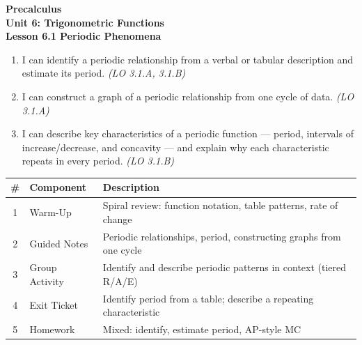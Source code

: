 \documentclass[10pt]{article}
\begin{document}
\vspace{-0.8in}

\begin{center}
  {\color{white}\textbf{\LARGE Precalculus}}\\[4pt]
  {\color{skymid}\large\textbf{Unit 6: Trigonometric Functions}}\\[6pt]
  {\color{white}\textbf{\large Lesson 6.1 \quad Periodic Phenomena}}
\end{center}

\vspace{0.22in}
\namedateperiod
\vspace{0.18in}

\begin{learningtargetbox}
\small
\begin{enumerate}[leftmargin=1.5em, itemsep=5pt]
  \item I can identify a periodic relationship from a verbal or tabular description
    and estimate its period. \hfill\textit{(LO 3.1.A, 3.1.B)}
  \item I can construct a graph of a periodic relationship from one cycle of data.
    \hfill\textit{(LO 3.1.A)}
  \item I can describe key characteristics of a periodic function --- period,
    intervals of increase/decrease, and concavity --- and explain why each
    characteristic repeats in every period. \hfill\textit{(LO 3.1.B)}
\end{enumerate}
\end{learningtargetbox}

\vspace{0.14in}

\begin{tocbox}
\small
\renewcommand{\arraystretch}{1.5}
\begin{tabularx}{\linewidth}{@{} c l X @{}}
\rowcolor{sky}
\textbf{\#} & \textbf{Component} & \textbf{Description} \\
\midrule
1 & Warm-Up        & Spiral review: function notation, table patterns, rate of change \\
2 & Guided Notes   & Periodic relationships, period, constructing graphs from one cycle \\
3 & Group Activity & Identify and describe periodic patterns in context (tiered R/A/E) \\
4 & Exit Ticket    & Identify period from a table; describe a repeating characteristic \\
5 & Homework       & Mixed: identify, estimate period, AP-style MC \\
\end{tabularx}
\end{tocbox}
\end{document}
